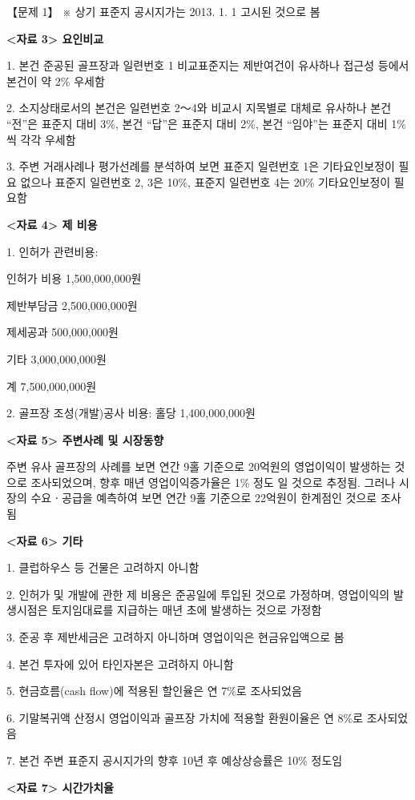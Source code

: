 \begin{longquestion}{【문제 1】}
※ 상기 표준지 공시지가는 2013. 1. 1 고시된 것으로 봄 \par
\textbf{<자료 3> 요인비교} \par
1. 본건 준공된 골프장과 일련번호 1 비교표준지는 제반여건이 유사하나 접근성 등에서 본건이 약 2\% 우세함 \par
2. 소지상태로서의 본건은 일련번호 2～4와 비교시 지목별로 대체로 유사하나 본건 “전”은 표준지 대비 3\%, 본건 “답”은 표준지 대비 2\%, 본건 “임야”는 표준지 대비 1\%씩 각각 우세함 \par
3. 주변 거래사례나 평가선례를 분석하여 보면 표준지 일련번호 1은 기타요인보정이 필요 없으나 표준지 일련번호 2, 3은 10\%, 표준지 일련번호 4는 20\% 기타요인보정이 필요함 \par
\textbf{<자료 4> 제 비용} \par
1. 인허가 관련비용: \par
인허가 비용 1,500,000,000원 \par
제반부담금 2,500,000,000원 \par
제세공과 500,000,000원 \par
기타 3,000,000,000원 \par
계 7,500,000,000원 \par
2. 골프장 조성(개발)공사 비용: 홀당 1,400,000,000원 \par
\textbf{<자료 5> 주변사례 및 시장동향} \par
주변 유사 골프장의 사례를 보면 연간 9홀 기준으로 20억원의 영업이익이 발생하는 것으로 조사되었으며, 향후 매년 영업이익증가율은 1\% 정도 일 것으로 추정됨. 그러나 시장의 수요ㆍ공급을 예측하여 보면 연간 9홀 기준으로 22억원이 한계점인 것으로 조사됨 \par
\textbf{<자료 6> 기타} \par
1. 클럽하우스 등 건물은 고려하지 아니함 \par
2. 인허가 및 개발에 관한 제 비용은 준공일에 투입된 것으로 가정하며, 영업이익의 발생시점은 토지임대료를 지급하는 매년 초에 발생하는 것으로 가정함 \par
3. 준공 후 제반세금은 고려하지 아니하며 영업이익은 현금유입액으로 봄 \par
4. 본건 투자에 있어 타인자본은 고려하지 아니함 \par
5. 현금흐름(cash flow)에 적용된 할인율은 연 7\%로 조사되었음 \par
6. 기말복귀액 산정시 영업이익과 골프장 가치에 적용할 환원이율은 연 8\%로 조사되었음 \par
7. 본건 주변 표준지 공시지가의 향후 10년 후 예상상승률은 10\% 정도임 \par
\textbf{<자료 7> 시간가치율} \par

\end{longquestion}
